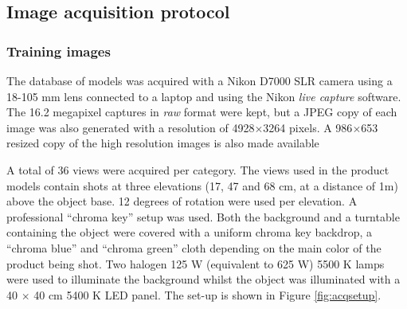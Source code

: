 \subsection{Image acquisition protocol}

\subsubsection{Training images}

The database of models was acquired with a Nikon D7000 SLR camera using a 18-105 mm lens connected to a laptop and using the Nikon \textit{live capture} software. The 16.2 megapixel captures in \textit{raw} format were kept, but a JPEG copy of each image was also generated with a resolution of 4928$\times$3264 pixels. A 986$\times$653 resized copy of the high resolution images is also made available

A total of 36 views were acquired per category. The views used in the product models contain shots at three elevations (17, 47 and 68 cm, at a distance of 1m) above the object base. 12 degrees of rotation were used per elevation. A professional ``chroma key'' setup was used. Both the background and a turntable containing the object were covered with a uniform chroma key backdrop, a ``chroma blue'' and ``chroma green'' cloth depending on the main color of the product being shot. Two halogen 125 W (equivalent to 625 W) 5500 K lamps were used to illuminate the background whilst the object was illuminated with a 40 $\times$ 40 cm 5400 K LED panel. The set-up is shown in Figure \ref{fig:acqsetup}.


